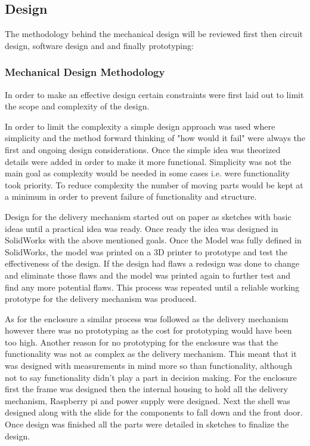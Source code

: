 \documentclass[a4paper,11pt]{article}
\numberwithin{figure}{section}
\numberwithin{table}{section}
\begin{document}
\subsection{Design}
The methodology behind the mechanical design will be reviewed first then circuit design, software design and and finally prototyping:
\subsubsection{Mechanical Design Methodology}
In order to make an effective design certain constraints were first laid out to limit the scope and complexity of the design.

In order to limit the complexity a simple design approach was used where simplicity and the method forward thinking of "how would it fail" were always the first and ongoing design considerations. Once the simple idea was theorized details were added in order to make it more functional. Simplicity was not the main goal as complexity would be needed in some cases i.e. were functionality took priority. To reduce complexity the number of moving parts would be kept at a minimum in order to prevent failure of functionality and structure. 

Design for the delivery mechanism started out on paper as sketches with basic ideas until a practical idea was ready. Once ready the idea was designed in SolidWorks with the above mentioned goals. Once the Model was fully defined in SolidWorks, the model was printed on a 3D printer to prototype and test the effectiveness of the design. If the design had flaws a redesign was done to change and eliminate those flaws and the model was printed again to further test and find any more potential flaws. This process was repeated until a reliable working prototype for the delivery mechanism was produced.

As for the enclosure a similar process was followed as the delivery mechanism however there was no prototyping as the cost for prototyping would have been too high. Another reason for no prototyping for the enclosure was that the functionality was not as complex as the delivery mechanism. This meant that it was designed with measurements in mind more so than functionality, although not to say functionality didn't play a part in decision making. For the enclosure first the frame was designed then the internal housing to hold all the delivery mechanism, Raspberry pi and power supply were designed. Next the shell was designed along with the slide for the components to fall down and the front door. Once design was finished all the parts were detailed in sketches to finalize the design.
\end{document}
